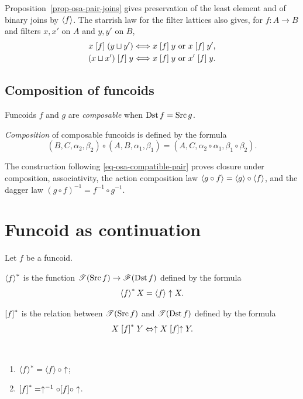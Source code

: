 Proposition~\ref{prop-osa-pair-joins} gives preservation of the least
element and of binary joins by $\left\langle f\right\rangle$. The starrish law for
the filter lattices also gives, for $f:A\to B$ and filters $x,x'$ on
$A$ and $y,y'$ on $B$,
\begin{align}
 x\mathrel{\left[f\right]}(y\sqcup y') &\Longleftrightarrow
 x\mathrel{\left[f\right]}y\ \text{or}\ x\mathrel{\left[f\right]}y',\label{fcd-f-d1}\\
 (x\sqcup x')\mathrel{\left[f\right]}y &\Longleftrightarrow
 x\mathrel{\left[f\right]}y\ \text{or}\ x'\mathrel{\left[f\right]}y.\label{fcd-f-d2}
\end{align}

\subsection{Composition of funcoids}
\begin{defn}
Funcoids $f$
and $g$ are \emph{composable} when $\operatorname{Dst} f=\operatorname{Src} g$.
\end{defn}

\begin{defn}
\emph{Composition}
of composable funcoids is defined by the formula
\[
(B,C,\alpha_{2},\beta_{2})\circ(A,B,\alpha_{1},\beta_{1})=(A,C,\alpha_{2}
\circ\alpha_{1},\beta_{1}\circ\beta_{2}).
\]
\end{defn}
The construction following \eqref{eq-osa-compatible-pair} proves
closure under composition, associativity, the action composition law
$\left\langle g\circ f\right\rangle=\left\langle g\right\rangle\circ\left\langle f\right\rangle$, and the dagger law
$(g\circ f)^{-1}=f^{-1}\circ g^{-1}$.

\section{Funcoid as continuation}

Let $f$ be a funcoid.
\begin{defn}
$\left\langle f\right\rangle ^{\ast}$ is the function $\mathscr{T}(\operatorname{Src} f)\rightarrow\mathscr{F}(\operatorname{Dst} f)$
defined by the formula
\[
\left\langle f\right\rangle ^{\ast}X=\left\langle f\right\rangle\uparrow X.
\]

\end{defn}

\begin{defn}
$\mathrel{\left[f\right]^{\ast}}$ is the relation between $\mathscr{T}(\operatorname{Src} f)$ and $\mathscr{T}(\operatorname{Dst}
f)$
defined by the formula
\[
X\mathrel{\left[f\right]^{\ast}}Y\Leftrightarrow\uparrow X\mathrel{\left[f\right]}\uparrow Y.
\]
\end{defn}
\begin{obvious}
~
\begin{enumerate}
\item $\left\langle f\right\rangle ^{\ast}=\left\langle f\right\rangle\circ\uparrow$;
\item $\mathord{\mathrel{\left[f\right]^{\ast}}}=\uparrow^{-1}\circ\mathord{\mathrel{\left[f\right]}}\circ\uparrow$.
\end{enumerate}
\end{obvious}


